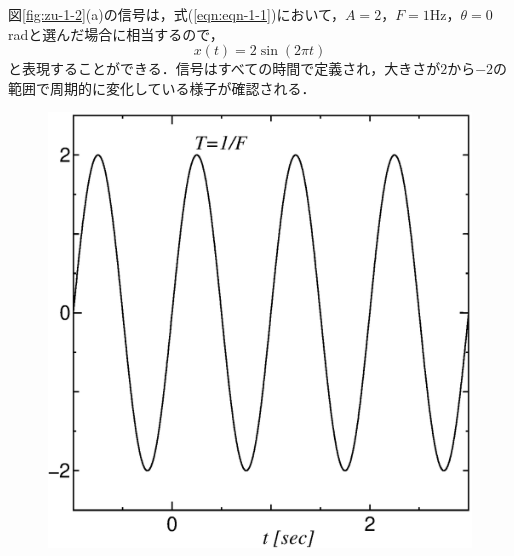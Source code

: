 図\ref{fig:zu-1-2}(a)の信号は，式(\ref{eqn:eqn-1-1})において，$A=2$，$F=1$Hz，$\theta=0$radと選んだ場合に相当するので，
\begin{equation}
x(t)=2 \sin (2\pi t)
\label{eqn:eqn-1-2}
\end{equation}
と表現することができる．信号はすべての時間で定義され，大きさが$2$から$-2$の範囲で周期的に変化している様子が確認される．

\begin{figure}[H]
\begin{center}
\begin{minipage}{.38\textwidth}
\begin{center}
\includegraphics[width=.95\textwidth]{fig/zu-1-2-a.eps}


\end{center}
\end{minipage}
\end{center}
\end{figure}
